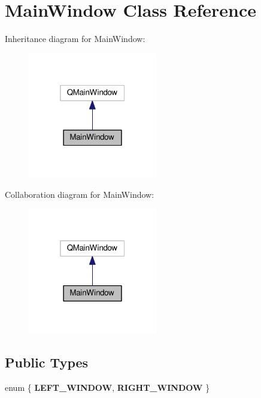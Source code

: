 \hypertarget{class_main_window}{}\section{Main\+Window Class Reference}
\label{class_main_window}


Inheritance diagram for Main\+Window\+:
\nopagebreak
\begin{figure}[H]
\begin{center}
\leavevmode
\includegraphics[width=160pt]{class_main_window__inherit__graph}
\end{center}
\end{figure}


Collaboration diagram for Main\+Window\+:
\nopagebreak
\begin{figure}[H]
\begin{center}
\leavevmode
\includegraphics[width=160pt]{class_main_window__coll__graph}
\end{center}
\end{figure}
\subsection*{Public Types}
\begin{DoxyCompactItemize}
\item 
enum \{ {\bfseries L\+E\+F\+T\+\_\+\+W\+I\+N\+D\+OW}, 
{\bfseries R\+I\+G\+H\+T\+\_\+\+W\+I\+N\+D\+OW}
 \}\hypertarget{class_main_window_a0ee5fdf298d8f30b5e29418348ecaacf}{}\label{class_main_window_a0ee5fdf298d8f30b5e29418348ecaacf}

\end{DoxyCompactItemize}
